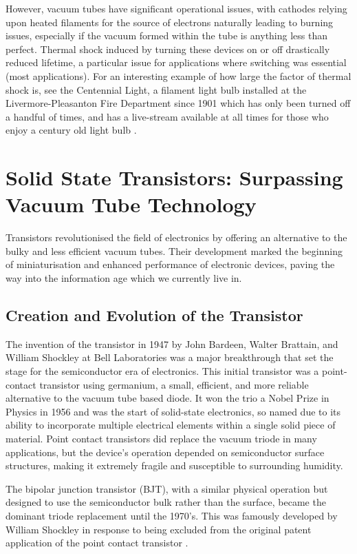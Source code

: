 \begin{refsection}
However, vacuum tubes have significant operational issues, with cathodes relying upon heated filaments for the source of electrons naturally leading to burning issues, especially if the vacuum formed within the tube is anything less than perfect. Thermal shock induced by turning these devices on or off drastically reduced lifetime, a particular issue for applications where switching was essential (most applications). For an interesting example of how large the factor of thermal shock is, see the Centennial Light, a filament light bulb installed at the Livermore-Pleasanton Fire Department since 1901 which has only been turned off a handful of times, and has a live-stream available at all times for those who enjoy a century old light bulb \cite{centennialbulb2024}.

\section{Solid State Transistors: Surpassing Vacuum Tube Technology}
Transistors revolutionised the field of electronics by offering an alternative to the bulky and less efficient vacuum tubes. Their development marked the beginning of miniaturisation and enhanced performance of electronic devices, paving the way into the information age which we currently live in.

\subsection{Creation and Evolution of the Transistor} 
The invention of the transistor in 1947 by John Bardeen, Walter Brattain, and William Shockley at Bell Laboratories was a major breakthrough that set the stage for the semiconductor era of electronics. This initial transistor was a point-contact transistor using germanium, a small, efficient, and more reliable alternative to the vacuum tube based diode. It won the trio a Nobel Prize in Physics in 1956 and was the start of solid-state electronics, so named due to its ability to incorporate multiple electrical elements within a single solid piece of material. Point contact transistors did replace the vacuum triode in many applications, but the device's operation depended on semiconductor surface structures, making it extremely fragile and susceptible to surrounding humidity. 

The bipolar junction transistor (BJT), with a similar physical operation but designed to use the semiconductor bulk rather than the surface, became the dominant triode replacement until the 1970's. This was famously developed by William Shockley in response to being excluded from the original patent application of the point contact transistor \cite{spectrum_transistor2022}. 


\end{refsection}
